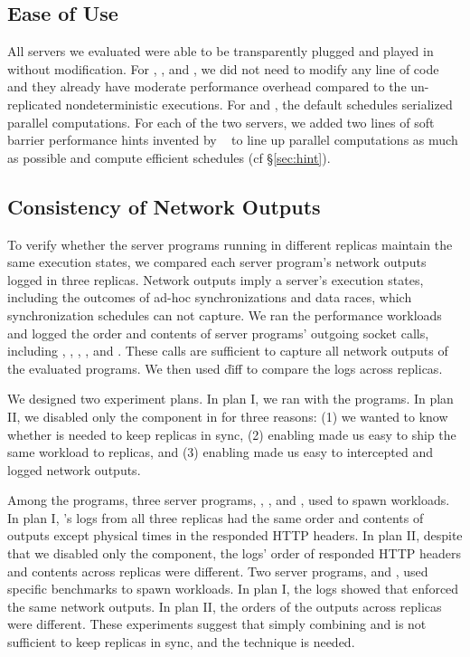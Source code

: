 \subsection{Ease of Use} \label{sec:ease-of-use}

All \nprog servers we evaluated were able to be transparently plugged and 
played in \xxx without modification. For \clamav, \mediatomb, and \mysql, we 
did not need to modify any line of code and they already have moderate 
performance overhead compared to the un-replicated nondeterministic executions. 
For \apache and \mongoose, the default schedules serialized parallel 
computations. For each of the two servers, we added two lines of soft barrier 
performance hints invented by \parrot~\cite{parrot:sosp13} to line up parallel 
computations as much as possible and compute efficient \dmt schedules (cf 
\S\ref{sec:hint}).

\subsection{Consistency of Network Outputs} \label{sec:correctness}

To verify whether the server programs running in different replicas maintain 
the same execution states, we compared each server program's network outputs 
logged in three replicas. Network outputs imply a server's execution states, 
including the outcomes of ad-hoc synchronizations and data races, which 
synchronization schedules can not capture. We ran the performance workloads and 
logged the order and contents of server programs' outgoing socket calls, 
including \send, \sendto, \sendmsg, \mywrite, and \pwrite. These calls are 
sufficient to capture all network outputs of the evaluated programs. We then 
used \v{diff} to compare the logs across replicas. 

We designed two experiment plans. In plan I, we ran \xxx with the 
programs. In plan II, we disabled only the \timealgo component in \xxx for 
three reasons: (1) we wanted to know whether \timealgo is needed to keep 
replicas in sync, (2) enabling \paxos made us easy to ship the same workload 
to replicas, and (3) enabling \parrot made us easy to intercepted and logged 
network outputs.

Among the \nprog programs, three server programs, \apache, \mediatomb, 
and \mongoose, used \ab to spawn workloads. In plan I, \xxx's logs from all 
three replicas had the same order and contents of outputs except physical 
times in the responded HTTP headers. In plan II, despite that we disabled only
the \timealgo component, the logs' order of responded HTTP headers and contents 
across replicas were different. Two server programs, \clamav and \mysql, 
used specific benchmarks to spawn workloads. In plan I, the logs showed that 
\xxx enforced the same network outputs. In plan II, the orders of the outputs 
across replicas were different. These experiments suggest that simply combining 
\paxos and \dmt is not sufficient to keep replicas in sync, and the \timealgo 
technique is needed.


